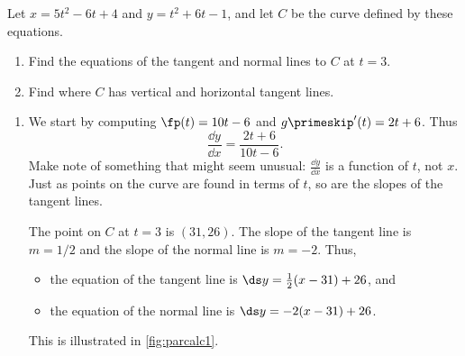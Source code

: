 \begin{example}\label{ex_parcalc1}
Let $x=5t^2-6t+4$ and $y=t^2+6t-1$, and let $C$ be the curve defined by these equations.
\begin{enumerate}
	\item	Find the equations of the tangent and normal lines to $C$ at $t=3$.
	\item	Find where $C$ has vertical and horizontal tangent lines.
\end{enumerate}
\solution
\begin{enumerate}
	\item We start by computing $\fp(t) = 10t-6$ and $g\primeskip'(t) =2t+6$. Thus \[\frac{\dd y}{\dd x} = \frac{2t+6}{10t-6}.\]
	Make note of something that might seem unusual: $\frac{\dd y}{\dd x}$ is a function of $t$, not $x$. Just as points on the curve are found in terms of $t$, so are the slopes of the tangent lines.

	The point on $C$ at $t=3$ is $(31,26)$. The slope of the tangent line is $m=1/2$ and the slope of the normal line is $m=-2$. Thus,
	\begin{itemize}
		\item the equation of the tangent line is $\ds y=\frac12(x-31)+26$, and
		\item	the equation of the normal line is $\ds y=-2(x-31)+26$.
	\end{itemize}
	This is illustrated in \autoref{fig:parcalc1}.



\end{enumerate}
\end{example}
